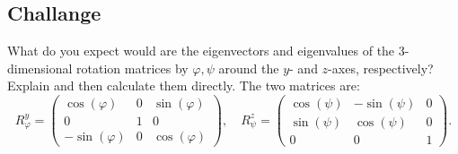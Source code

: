 \subsection{Challange}
What do you expect would are the eigenvectors and eigenvalues of the 3-dimensional rotation matrices by $\varphi,\psi$ around the $y$- and $z$-axes, respectively? Explain and then calculate them directly. The two matrices are:
\begin{equation*}
	R^{y}_{\varphi} =
	\begin{pmatrix}
		\cos(\varphi) & 0 & \sin(\varphi)\\
		0 & 1 & 0\\
		-\sin(\varphi) & 0 & \cos(\varphi)
	\end{pmatrix},\quad
	R^{z}_{\psi}  =
	\begin{pmatrix}
		\cos(\psi) & -\sin(\psi)& 0\\
		\sin(\psi) & \cos(\psi) & 0\\
		0 & 0 & 1
	\end{pmatrix}.
	\label{eq:3d_rot}
\end{equation*}
